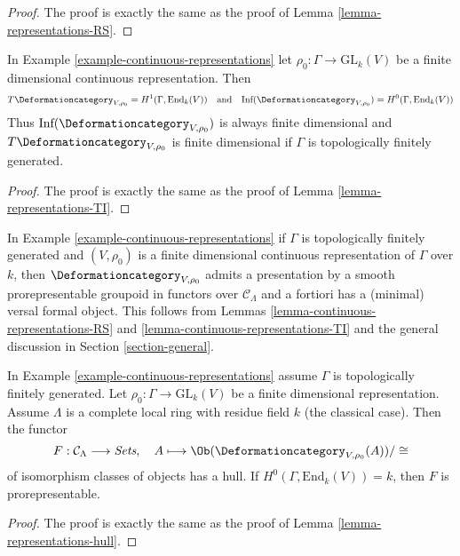 \begin{proof}
The proof is exactly the same as the proof of
Lemma \ref{lemma-representations-RS}.
\end{proof}

\begin{lemma}
\label{lemma-continuous-representations-TI}
In Example \ref{example-continuous-representations} let
$\rho_0 : \Gamma \to \text{GL}_k(V)$ be a finite dimensional
continuous representation. Then
$$
T\Deformationcategory_{V, \rho_0} = H^1(\Gamma, \text{End}_k(V))
\quad\text{and}\quad
\text{Inf}(\Deformationcategory_{V, \rho_0}) = H^0(\Gamma, \text{End}_k(V))
$$
Thus $\text{Inf}(\Deformationcategory_{V, \rho_0})$
is always finite dimensional
and $T\Deformationcategory_{V, \rho_0}$ is finite dimensional
if $\Gamma$ is topologically finitely generated.
\end{lemma}

\begin{proof}
The proof is exactly the same as the proof of
Lemma \ref{lemma-representations-TI}.
\end{proof}

\noindent
In Example \ref{example-continuous-representations} if $\Gamma$
is topologically finitely generated
and $(V, \rho_0)$ is a finite dimensional continuous representation of $\Gamma$
over $k$, then $\Deformationcategory_{V, \rho_0}$
admits a presentation by a smooth prorepresentable groupoid in functors
over $\mathcal{C}_\Lambda$
and a fortiori has a (minimal) versal formal object. This follows
from Lemmas \ref{lemma-continuous-representations-RS} and
\ref{lemma-continuous-representations-TI}
and the general discussion in Section \ref{section-general}.

\begin{lemma}
\label{lemma-continuous-representations-hull}
In Example \ref{example-continuous-representations} assume $\Gamma$
is topologically finitely generated.
Let $\rho_0 : \Gamma \to \text{GL}_k(V)$ be a finite dimensional representation.
Assume $\Lambda$ is a complete local ring with residue field $k$
(the classical case). Then the functor
$$
F : \mathcal{C}_\Lambda \longrightarrow \textit{Sets},\quad
A \longmapsto \Ob(\Deformationcategory_{V, \rho_0}(A))/\cong
$$
of isomorphism classes of objects has a hull. If
$H^0(\Gamma, \text{End}_k(V)) = k$, then $F$ is
prorepresentable.
\end{lemma}

\begin{proof}
The proof is exactly the same as the proof of
Lemma \ref{lemma-representations-hull}.
\end{proof}



